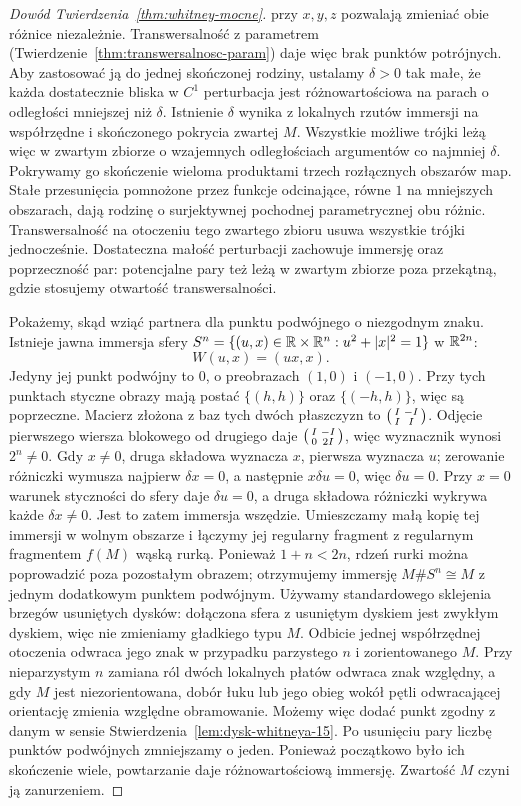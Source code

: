 \begin{proof}[Dowód Twierdzenia~\ref{thm:whitney-mocne}]
przy $x,y,z$ pozwalają zmieniać
obie różnice niezależnie.
Transwersalność z parametrem
(Twierdzenie~\ref{thm:transwersalnosc-param})
daje więc brak punktów potrójnych. Aby zastosować
ją do jednej skończonej rodziny, ustalamy
$\delta>0$ tak małe, że każda dostatecznie bliska
w $C^1$ perturbacja jest różnowartościowa na parach
o odległości mniejszej niż $\delta$. Istnienie
$\delta$ wynika z lokalnych rzutów immersji na
współrzędne i skończonego pokrycia zwartej $M$.
Wszystkie możliwe trójki leżą więc w zwartym zbiorze
o wzajemnych odległościach argumentów co najmniej
$\delta$. Pokrywamy go skończenie wieloma produktami
trzech rozłącznych obszarów map. Stałe przesunięcia
pomnożone przez funkcje odcinające, równe $1$ na
mniejszych obszarach, dają rodzinę o surjektywnej
pochodnej parametrycznej obu różnic. Transwersalność
na otoczeniu tego zwartego zbioru usuwa wszystkie
trójki jednocześnie. Dostateczna małość perturbacji
zachowuje immersję oraz poprzeczność par: potencjalne
pary też leżą w zwartym zbiorze poza przekątną,
gdzie stosujemy otwartość transwersalności.

Pokażemy, skąd wziąć partnera dla
punktu podwójnego o niezgodnym znaku.
Istnieje jawna immersja sfery
$S^n=\{(u,x)\in\mathbb{R}\times\mathbb{R}^n:
u^2+|x|^2=1\}$ w $\mathbb{R}^{2n}$:
\[
 W(u,x)=(ux,x).
\]
Jedyny jej punkt podwójny to $0$,
o preobrazach $(1,0)$ i $(-1,0)$.
Przy tych punktach styczne obrazy
mają postać $\{(h,h)\}$ oraz
$\{(-h,h)\}$, więc są poprzeczne.
Macierz złożona z baz tych dwóch płaszczyzn to
$\begin{psmallmatrix}I&-I\\I&I\end{psmallmatrix}$.
Odjęcie pierwszego wiersza blokowego od drugiego
daje $\begin{psmallmatrix}I&-I\\0&2I\end{psmallmatrix}$,
więc wyznacznik wynosi $2^n\ne0$.
Gdy $x\ne0$, druga składowa
wyznacza $x$, pierwsza wyznacza $u$;
zerowanie różniczki wymusza najpierw $\delta x=0$,
a następnie $x\delta u=0$, więc $\delta u=0$.
Przy $x=0$ warunek styczności do sfery daje
$\delta u=0$, a druga składowa różniczki wykrywa
każde $\delta x\ne0$. Jest to zatem immersja wszędzie. Umieszczamy małą
kopię tej immersji w wolnym
obszarze i łączymy jej regularny
fragment z regularnym fragmentem
$f(M)$ wąską rurką. Ponieważ
$1+n<2n$, rdzeń rurki można
poprowadzić poza pozostałym
obrazem; otrzymujemy immersję
$M\#S^n\cong M$ z jednym
dodatkowym punktem podwójnym. Używamy standardowego
sklejenia brzegów usuniętych dysków: dołączona
sfera z usuniętym dyskiem jest zwykłym dyskiem,
więc nie zmieniamy gładkiego typu $M$.
Odbicie jednej współrzędnej
otoczenia odwraca jego znak
w przypadku parzystego
$n$ i zorientowanego $M$.
Przy nieparzystym $n$ zamiana
ról dwóch lokalnych płatów
odwraca znak względny,
a gdy $M$ jest niezorientowana,
dobór łuku lub jego obieg wokół
pętli odwracającej orientację
zmienia względne obramowanie.
Możemy więc dodać punkt
zgodny z danym w sensie
Stwierdzenia~\ref{lem:dysk-whitneya-15}.
Po usunięciu pary liczbę
punktów podwójnych zmniejszamy
o jeden. Ponieważ początkowo
było ich skończenie wiele,
powtarzanie daje różnowartościową
immersję. Zwartość $M$ czyni
ją zanurzeniem.


\end{proof}
